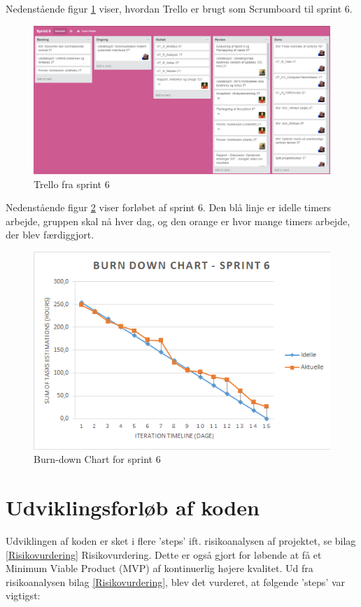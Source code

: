Nedenstående figur \ref{Trello} viser, hvordan Trello er brugt som Scrumboard til sprint 6. 

\begin{figure}[H]
    \centering
    \includegraphics[width=1\textwidth]{figurer/d/Trello}
    \caption{Trello fra sprint 6}
    \label{Trello}
\end{figure}

Nedenstående figur \ref{Burn} viser forløbet af sprint 6. Den blå linje er idelle timers arbejde, gruppen skal nå hver dag, og den orange er hvor mange timers arbejde, der blev færdiggjort. 

\begin{figure}[H]
    \centering
    \includegraphics[width=1\textwidth]{figurer/d/Burn-down}
    \caption{Burn-down Chart for sprint 6}
    \label{Burn}
\end{figure}

\newpage

\section{Udviklingsforløb af koden}
Udviklingen af koden er sket i flere 'steps' ift. risikoanalysen af projektet, se bilag \ref{Risikovurdering} Risikovurdering. Dette er også gjort for løbende at få et Minimum Viable Product (MVP) af kontinuerlig højere kvalitet. 
Ud fra risikoanalysen bilag \ref{Risikovurdering}, blev det vurderet, at følgende 'steps' var vigtigst:

